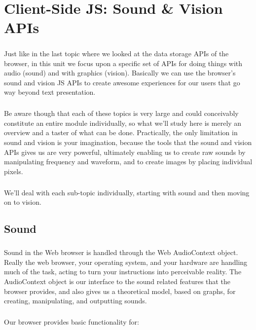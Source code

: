 \chapter{Client-Side JS: Sound \& Vision APIs}
\label{sound-and-vision}
\paragraph{} Just like in the last topic where we looked at the data storage APIs of the browser, in this unit we focus upon a specific set of APIs for doing things with audio (sound) and with graphics (vision). Basically we can use the browser's sound and vision JS APIs to create awesome experiences for our users that go way beyond text presentation.
\paragraph{} Be aware though that each of these topics is very large and could conceivably constitute an entire module individually, so what we'll study here is merely an overview and a taster of what can be done. Practically, the only limitation in sound and vision is your imagination, because the tools that the sound and vision APIs gives us are very powerful, ultimately enabling us to create raw sounds by manipulating frequency and waveform, and to create images by placing individual pixels.
\paragraph{} We'll deal with each sub-topic individually, starting with sound and then moving on to vision.

\section{Sound}

\paragraph{} Sound in the Web browser is handled through the Web AudioContext object. Really the web browser, your operating system, and your hardware are handling much of the task, acting to turn your instructions into perceivable reality. The AudioContext object is our interface to the sound related features that the browser provides, and also gives us a theoretical model, based on graphs, for creating, manipulating, and outputting sounds.

\paragraph{} Our browser provides basic functionality for:

